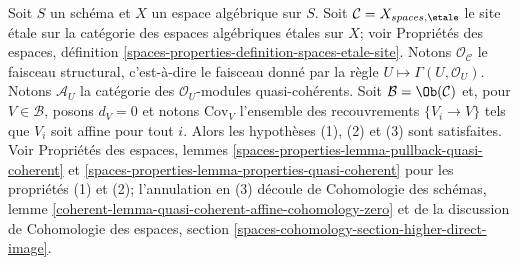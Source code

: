 \begin{example}
\label{example-quasi-coherent-spaces-etale}
Soit $S$ un schéma et $X$ un espace algébrique sur $S$.
Soit $\mathcal{C} = X_{spaces, \etale}$ le site \'etale
sur la catégorie des espaces algébriques étales sur $X$; voir
Propriétés des espaces, définition
\ref{spaces-properties-definition-spaces-etale-site}.
Notons $\mathcal{O}_\mathcal{C}$ le faisceau structural, c'est-à-dire le faisceau
donné par la règle $U \mapsto \Gamma(U, \mathcal{O}_U)$.
Notons $\mathcal{A}_U$ la catégorie des $\mathcal{O}_U$-modules quasi-cohérents.
Soit $\mathcal{B} = \Ob(\mathcal{C})$ et, pour $V \in \mathcal{B}$,
posons $d_V = 0$ et notons $\text{Cov}_V$ l'ensemble des
recouvrements $\{V_i \to V\}$ tels que $V_i$ soit affine pour tout $i$.
Alors les hypothèses (1), (2) et (3) sont satisfaites.
Voir Propriétés des espaces, lemmes
\ref{spaces-properties-lemma-pullback-quasi-coherent} et
\ref{spaces-properties-lemma-properties-quasi-coherent}
pour les propriétés (1) et (2); l'annulation en (3) découle de
Cohomologie des schémas, lemme
\ref{coherent-lemma-quasi-coherent-affine-cohomology-zero}
et de la discussion de Cohomologie des espaces, section
\ref{spaces-cohomology-section-higher-direct-image}.
\end{example}


